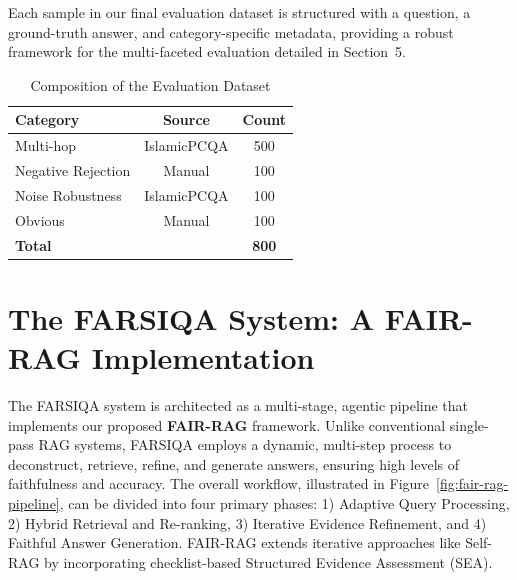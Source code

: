 \documentclass[11pt]{article}
\begin{document}
Each sample in our final evaluation dataset is structured with a question, a ground-truth answer, and category-specific metadata, providing a robust framework for the multi-faceted evaluation detailed in Section~5.

\begin{table}[t]
\centering
\begin{tabular}{lcc}
\hline
\textbf{Category} & \textbf{Source} & \textbf{Count} \\
\hline
Multi-hop & IslamicPCQA & 500 \\
Negative Rejection & Manual & 100 \\
Noise Robustness & IslamicPCQA & 100 \\
Obvious & Manual & 100 \\
\hline
\textbf{Total} & & \textbf{800} \\
\hline
\end{tabular}
\caption{Composition of the Evaluation Dataset}
\label{tab:eval-dataset}
\end{table}

\section{The FARSIQA System: A FAIR-RAG Implementation}

The FARSIQA system is architected as a multi-stage, agentic pipeline that implements our proposed \textbf{FAIR-RAG} framework. \cite{fairrag} Unlike conventional single-pass RAG systems, FARSIQA employs a dynamic, multi-step process to deconstruct, retrieve, refine, and generate answers, ensuring high levels of faithfulness and accuracy. The overall workflow, illustrated in Figure~\ref{fig:fair-rag-pipeline}, can be divided into four primary phases: 1) Adaptive Query Processing, 2) Hybrid Retrieval and Re-ranking, 3) Iterative Evidence Refinement, and 4) Faithful Answer Generation. FAIR-RAG extends iterative approaches like Self-RAG \cite{asai2023self} by incorporating checklist-based Structured Evidence Assessment (SEA).
\end{document}
